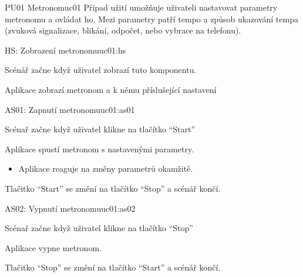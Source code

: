 \begin{usecase}{PU01 Metronom}{uc01}
    Případ užití umožňuje uživateli nastavovat parametry metronomu a ovládat ho. Mezi parametry patří tempo a způsob ukazování tempa (zvuková signalizace, blikání, odpočet, nebo vybrace na telefonu).

    \begin{scenario}{HS: Zobrazení metronomu}{uc01:hs}
        \item Scénář začne když uživatel zobrazí tuto komponentu.
        \item Aplikace zobrazí metronom a k němu příslušející nastavení
    \end{scenario}

    \begin{scenario}{AS01: Zapnutí metronomu}{uc01:as01}
        \item Scénař začne když uživatel klikne na tlačítko \enquote{Start}
        \item Aplikace spustí metronom s nastavenými parametry.
        \begin{itemize}
            \item Aplikace reaguje na změny parametrů okamžitě.
        \end{itemize}
        \item Tlačitko \enquote{Start} se změní na tlačítko \enquote{Stop} a scénář končí.
    \end{scenario}

    \begin{scenario}{AS02: Vypnutí metronomu}{uc01:as02}
        \item Scénař začne když uživatel klikne na tlačítko \enquote{Stop}
        \item Aplikace vypne metronom.
        \item Tlačitko \enquote{Stop} se změní na tlačítko \enquote{Start} a scénář končí.
    \end{scenario}
\end{usecase}